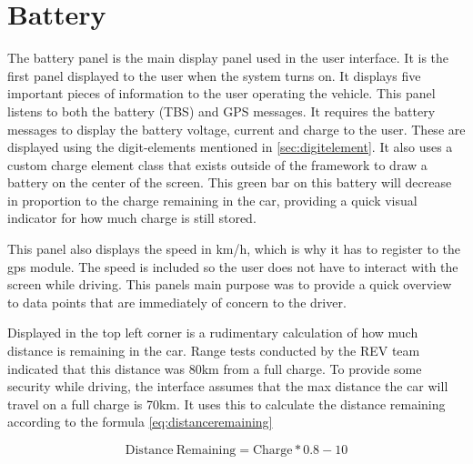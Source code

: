 

\section{Battery}

The battery panel is the main display panel used in the user interface. It is the first panel displayed to the user when the system turns on.  It displays five important pieces of information to the user operating the vehicle. This panel listens to both the battery (TBS) and GPS messages. It requires the battery messages to display the battery voltage, current and charge to the user. These are displayed using the digit-elements mentioned in \ref{sec:digitelement}. It also uses a custom charge element class that exists outside of the framework to draw a battery on the center of the screen. This green bar on this battery will decrease in proportion to the charge remaining in the car, providing a quick visual indicator for how much charge is still stored. 

This panel also displays the speed in km/h, which is why it has to register to the gps module. The speed is included so the user does not have to interact with the screen while driving. This panels main purpose was to provide a quick overview to data points that are immediately of concern to the driver. 

Displayed in the top left corner is a rudimentary calculation of how much distance is remaining in the car. Range tests conducted by the REV team indicated that this distance was 80km from a full charge. To provide some security while driving, the interface assumes that the max distance the car will travel on a full charge is 70km. It uses this to calculate the distance remaining according to the formula \ref{eq:distanceremaining}

\begin{equation}
\label{eq:distanceremaining}
\mathrm{Distance\ Remaining} = \mathrm{Charge}* 0.8 -10
\end{equation}






